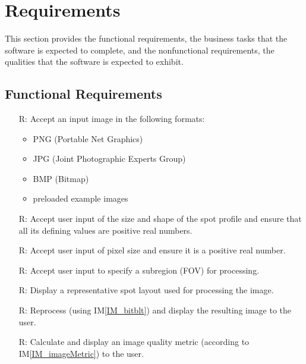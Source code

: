 \documentclass[12pt]{article}
\newcommand{\iref}[1]{IM\ref{#1}}
\newcounter{reqnum} %
\begin{document}

\newpage
\section{Requirements}

This section provides the functional requirements, the business tasks that the
software is expected to complete, and the nonfunctional requirements, the
qualities that the software is expected to exhibit.

\subsection{Functional Requirements}

\noindent \begin{itemize}

\item[R\refstepcounter{reqnum}\thereqnum \label{R_Inputs}:] Accept an input 
image in the following formats:

  \noindent \begin{itemize}
    \item PNG (Portable Net Graphics)
    \item JPG (Joint Photographic Experts Group)
    \item BMP (Bitmap)
    \item preloaded example images
  \end{itemize}

\item[R\refstepcounter{reqnum}\thereqnum \label{R_userSpotProfile}:] Accept user 
input of the size and shape of the spot profile and ensure that all its defining 
values are positive real numbers.

\item[R\refstepcounter{reqnum}\thereqnum \label{R_userPixelSize}:] Accept user 
input of pixel size and ensure it is a positive real number.

\item[R\refstepcounter{reqnum}\thereqnum \label{R_subregion}:] Accept user
input to specify a subregion (FOV) for processing.

\item[R\refstepcounter{reqnum}\thereqnum \label{R_spotLayout}:] Display a 
representative spot layout used for processing the image.

\item[R\refstepcounter{reqnum}\thereqnum \label{R_resultImage}:] Reprocess 
(using \iref{IM_bitblt}) and display the resulting image to the user.

\item[R\refstepcounter{reqnum}\thereqnum \label{R_imageMetric}:] Calculate and 
display an image quality metric (according to \iref{IM_imageMetric}) to the user.

\end{itemize}
\end{document}
